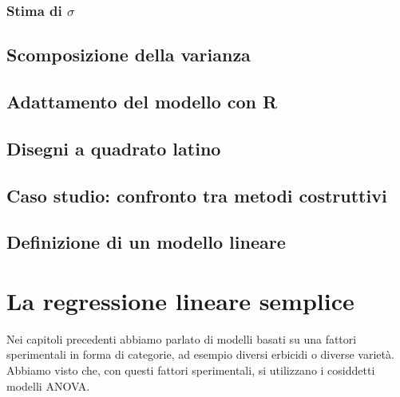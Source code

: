 \documentclass[a4paper,12pt,oneside]{book}
\begin{document}
\hypertarget{stima-di-sigma-1}{%
\subsection{\texorpdfstring{Stima di \(\sigma\)}{Stima di \textbackslash sigma}}\label{stima-di-sigma-1}}

\hypertarget{scomposizione-della-varianza-1}{%
\section{Scomposizione della varianza}\label{scomposizione-della-varianza-1}}

\hypertarget{adattamento-del-modello-con-r}{%
\section{Adattamento del modello con R}\label{adattamento-del-modello-con-r}}

\hypertarget{disegni-a-quadrato-latino-1}{%
\section{Disegni a quadrato latino}\label{disegni-a-quadrato-latino-1}}

\hypertarget{caso-studio-confronto-tra-metodi-costruttivi}{%
\section{Caso studio: confronto tra metodi costruttivi}\label{caso-studio-confronto-tra-metodi-costruttivi}}

\hypertarget{definizione-di-un-modello-lineare-2}{%
\section{Definizione di un modello lineare}\label{definizione-di-un-modello-lineare-2}}

\hypertarget{la-regressione-lineare-semplice}{%
\chapter{La regressione lineare semplice}\label{la-regressione-lineare-semplice}}

Nei capitoli precedenti abbiamo parlato di modelli basati su una fattori sperimentali in forma di categorie, ad esempio diversi erbicidi o diverse varietà. Abbiamo visto che, con questi fattori sperimentali, si utilizzano i cosiddetti modelli ANOVA.
\end{document}
